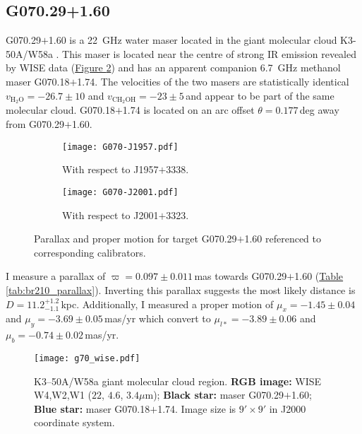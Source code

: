         \subsection{G070.29+1.60}
            G070.29$+$1.60 is a 22~GHz water maser located in the giant molecular cloud K3-50A/W58a \citep{Kohoutek1965,Wynn1969}. This maser is located near the centre of strong IR emission revealed by WISE data (\hyperref[fig:g070_pos]{Figure \ref*{fig:g070_pos}}) and has an apparent companion 6.7~GHz methanol maser G070.18$+$1.74. The velocities of the two masers are statistically identical $v_{\text{H}_2\text{O}}=-26.7\pm10$ and $v_{\text{CH}_2\text{OH}}=-23\pm5$\,\kms and appear to be part of the same molecular cloud. G070.18$+$1.74 is located on an arc offset $\theta=0.177$\,deg away from G070.29$+$1.60. 
            
            \begin{figure}[h]
            	\centering
            	\begin{subfigure}[t]{0.9\textwidth}
            		\texttt{[image: G070-J1957.pdf]}
            		\caption{With respect to J1957$+$3338.}
            	\end{subfigure}
            	\vfill
            	\begin{subfigure}[t]{0.9\textwidth}
            		\texttt{[image: G070-J2001.pdf]}
            		\caption{With respect to J2001$+$3323.}
            	\end{subfigure}
            	\caption[G070.29$+$1.60 Parallax Fit]{Parallax and proper motion for target G070.29$+$1.60 referenced to corresponding calibrators.}
            	\label{fig:per_g070parallax}
            \end{figure}
            
            I measure a parallax of $\varpi=0.097\pm0.011$\,mas towards G070.29$+$1.60 (\hyperref[tab:br210_parallax]{Table \ref*{tab:br210_parallax}}). Inverting this parallax suggests the most likely distance is $D=11.2^{+1.2}_{-1.1}$\,kpc. Additionally, I measured a proper motion of $\mu_x=-1.45\pm0.04$ and $\mu_y=-3.69\pm0.05$\,mas/yr which convert to $\mu_{l*}=-3.89\pm0.06$ and $\mu_b=-0.74\pm0.02$\,mas/yr.
            
            \begin{figure}[h]
        		\centering
        		\texttt{[image: g70\_wise.pdf]}
        		\caption[K3--50A/W58a GMC and Masers]{K3--50A/W58a giant molecular cloud region. \textbf{RGB image:} WISE W4,W2,W1 ($22$, $4.6$, $3.4\mu$m); \textbf{Black star:} \water\space maser G070.29$+$1.60; \textbf{Blue star:} \choh\space maser G070.18$+$1.74. Image size is $9'\times9'$ in J2000 coordinate system.}\label{fig:g070_pos}
        	\end{figure}
        
